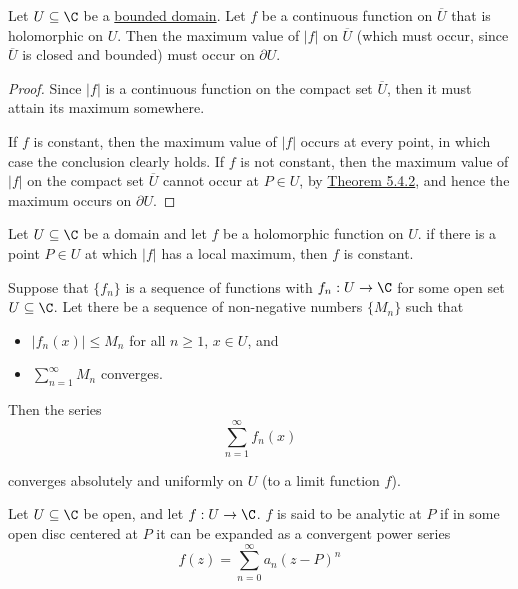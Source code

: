 \label{befe6f9}

Let $U\subseteq\C$ be a \href{f2be1bc}{bounded domain}. Let $f$ be a continuous
function on $\overline U$ that is holomorphic on $U$. Then the maximum value of
$|f|$ on $\overline U$ (which must occur, since $\overline U$ is closed and
bounded) must occur on $\partial U$.

\begin{proof}
  Since $|f|$ is a continuous function on the compact set $\overline U$, then it
  must attain its maximum somewhere.

  If $f$ is constant, then the maximum value of $|f|$ occurs at every point, in
  which case the conclusion clearly holds. If $f$ is not constant, then the
  maximum value of $|f|$ on the compact set $\overline U$ cannot occur at $P\in
  U$, by \href{bfc4e84}{Theorem 5.4.2}, and hence the maximum occurs on $\partial
  U$.
\end{proof}

\label{c3c0370}

Let $U\subseteq\C$ be a domain and let $f$ be a holomorphic function on $U$. if
there is a point $P\in U$ at which $|f|$ has a local maximum, then $f$ is
constant.

\label{d4a96c1}

Suppose that $\{f_n\}$ is a sequence of functions with $f_n:U\to\C$ for some
open set $U\subseteq\C$. Let there be a sequence of non-negative numbers
$\{M_n\}$ such that
\begin{itemize}
  \item $|f_n(x)|\leq M_n$ for all $n\geq1$, $x\in U$, and
  \item $\sum_{n=1}^\infty M_n$ converges.
\end{itemize}

Then the series
\begin{equation*}
  \sum_{n=1}^\infty f_n(x)
\end{equation*}

converges absolutely and uniformly on $U$ (to a limit function $f$).

\label{ccd773b}

Let $U\subseteq\C$ be open, and let $f:U\to\C$. $f$ is said to be analytic at
$P$ if in some open disc centered at $P$ it can be expanded as a convergent
power series
$$
  f(z)=\sum_{n=0}^\infty a_n(z-P)^n
$$

